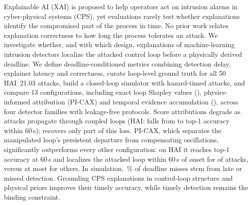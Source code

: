 Explainable AI (XAI) is proposed to help operators act on intrusion alarms in cyber-physical systems (CPS), yet evaluations rarely test whether explanations identify the compromised part of the process in time. No prior work relates explanation correctness to how long the process tolerates an attack. We investigate whether, and with which design, explanations of machine-learning intrusion detectors localize the attacked control loop before a physically derived deadline. We define deadline-conditioned metrics combining detection delay, explainer latency and correctness, curate loop-level ground truth for all 50 HAI~21.03 attacks, build a closed-loop simulator with \SimNattacks{} hazard-timed attacks, and compare 13 configurations, including exact loop Shapley values (\LX), physics-informed attribution (PI-CAX) and temporal evidence accumulation (\TEA), across four detector families with leakage-free protocols. Score attributions degrade as attacks propagate through coupled loops (HAI: \LX{} falls from \lochaiLXalarmZerosinglehrOne{} to \lochaiLXalarmSixZerosinglehrOne{} top-1 accuracy within 60\,s); \TEA{} recovers only part of this loss. PI-CAX, which separates the manipulated loop's persistent departure from compensating oscillations, significantly outperforms every other configuration: on HAI it reaches \lochaiPICAXalarmSixZeroteahrOne{} top-1 accuracy at 60\,s and localizes the attacked loop within 60\,s of onset for \dclhaiPICAXdclfixedSixZerotea{} of attacks, versus at most \dclhaiIGdclfixedSixZerotea{} for others. In simulation, \intimeFailUndeliveredPct\,\% of deadline misses stem from late or missed detection. Grounding CPS explanations in control-loop structure and physical priors improves their timely accuracy, while timely detection remains the binding constraint.

